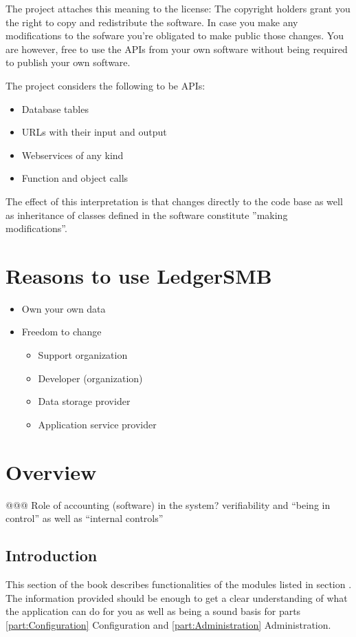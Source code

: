The project attaches this meaning to the license:
The copyright holders grant you the right to copy and
redistribute the software.  In case you make any modifications to the sofware
you're obligated to make public those changes.  You are however, free to use
the APIs from your own software without being required to publish your own software.

The project considers the following to be APIs:
\begin{itemize}
\item Database tables
\item URLs with their input and output
\item Webservices of any kind
\item Function and object calls
\end{itemize}

The effect of this interpretation is that changes directly to the code base as
well as inheritance of classes defined in the software constitute ''making modifications''.

\chapter{Reasons to use LedgerSMB}
\label{cha:Advocacy}

\begin{itemize}
\item Own your own data
\item Freedom to change
	\begin{itemize}
	\item Support organization
	\item Developer (organization)
	\item Data storage provider
	\item Application service provider
	\end{itemize}
\end{itemize}

\chapter{Overview}

@@@ Role of accounting (software) in the system? verifiability and ``being in control'' as well as ``internal controls''

\section{Introduction}
This section of the book describes functionalities of the modules listed in section .  The information provided should be enough to get a clear
understanding of what the application can do for you as well as being a sound basis
for parts \ref{part:Configuration} Configuration and \ref{part:Administration} Administration.

